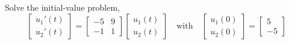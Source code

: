 \documentclass[../book.tex]{subfiles}
\begin{document}
\begin{example} \label{eg:repeat}
Solve the initial-value problem,
\begin{equation}\label{eq:sys-37}
\begin{bmatrix}
  u_1'(t) \\ u_2'(t)
\end{bmatrix}
=
\begin{bmatrix}
  -5 & 9 \\
  -1 & 1
\end{bmatrix}
\begin{bmatrix}
  u_1(t) \\ u_2(t)
\end{bmatrix}
\quad \text{with}
\quad
\begin{bmatrix}
  u_1(0) \\ u_2(0)
\end{bmatrix}
=
\begin{bmatrix}
  5 \\ -5
\end{bmatrix}
\end{equation}
\vspace{0.1cm}
\end{example}
\end{document}
